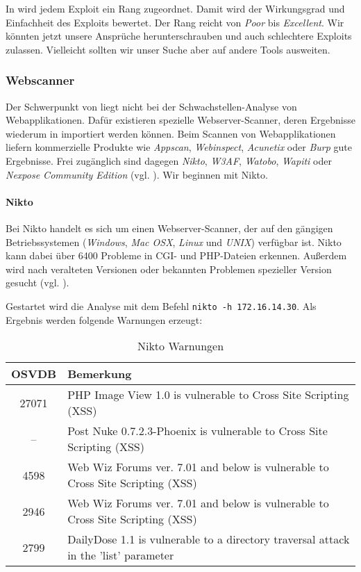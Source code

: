 
In \Metasploit{} wird jedem Exploit ein Rang zugeordnet. Damit wird der
Wirkungsgrad und Einfachheit des Exploits bewertet. Der Rang reicht von
\emph{Poor} bis \emph{Excellent}. Wir könnten jetzt unsere Ansprüche
herunterschrauben und auch schlechtere Exploits zulassen. Vielleicht sollten wir
unser Suche aber auf andere Tools ausweiten.


\subsubsection{Webscanner}

Der Schwerpunkt von \Metasploit{} liegt nicht bei der Schwachstellen-Analyse von
Webapplikationen. Dafür existieren spezielle Webserver-Scanner, deren Ergebnisse
wiederum in \Metasploit{} importiert werden können. Beim Scannen von
Webapplikationen liefern kommerzielle Produkte wie \emph{Appscan},
\emph{Webinspect}, \emph{Acunetix} oder \emph{Burp} gute Ergebnisse. Frei
zugänglich sind dagegen \emph{Nikto}, \emph{W3AF}, \emph{Watobo}, \emph{Wapiti}
oder \emph{Nexpose Community Edition} (vgl. \cite[S.~281]{metahandbuch}). Wir
beginnen mit Nikto.

\paragraph{Nikto}

Bei Nikto handelt es sich um einen Webserver-Scanner, der auf den gängigen
Betriebssystemen (\emph{Windows}, \emph{Mac OSX}, \emph{Linux} und \emph{UNIX})
verfügbar ist. Nikto kann dabei über 6400 Probleme in CGI- und PHP-Dateien
erkennen. Außerdem wird nach veralteten Versionen oder bekannten Problemen
spezieller Version gesucht (vgl. \cite{Nikto}).

Gestartet wird die Analyse mit dem Befehl \texttt{nikto -h 172.16.14.30}. Als
Ergebnis werden folgende Warnungen erzeugt:

\begin{table}[H]
\caption{Nikto Warnungen}
\label{NiktoResult}
\centering
\begin{tabular}{cp{9cm}}
\toprule
OSVDB\footnotemark & Bemerkung\\
\midrule
27071 & PHP Image View 1.0 is vulnerable to Cross Site Scripting (XSS)\\
-- & Post Nuke 0.7.2.3-Phoenix is vulnerable to Cross Site Scripting (XSS) \\
4598 & Web Wiz Forums ver. 7.01 and below is vulnerable to Cross Site Scripting (XSS)\\
2946 & Web Wiz Forums ver. 7.01 and below is vulnerable to Cross Site Scripting (XSS)\\
2799 & DailyDose 1.1 is vulnerable to a directory traversal attack in the 'list' parameter\\
\bottomrule
\end{tabular}
\end{table}

